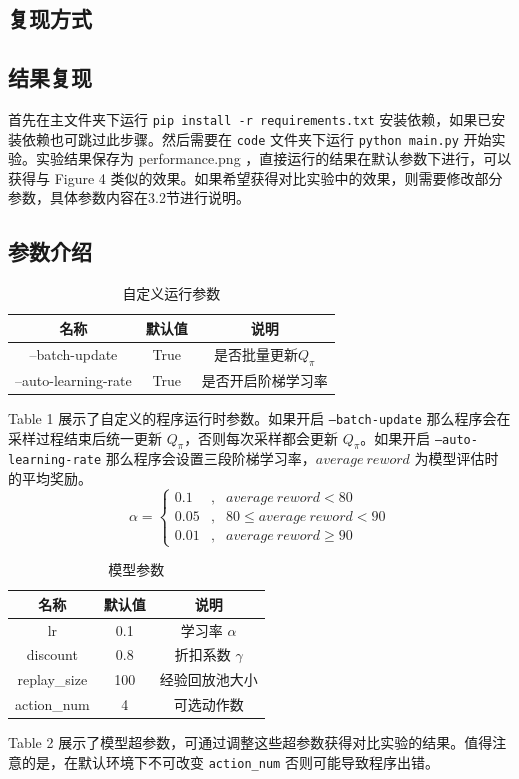 \documentclass[a4paper,12pt]{article}
\begin{document}
\begin{CJK}{UTF8}{gbsn}
\section{复现方式}
\subsection{结果复现}
首先在主文件夹下运行 \texttt{pip install -r requirements.txt} 安装依赖，如果已安装依赖也可跳过此步骤。然后需要在 \texttt{code} 文件夹下运行 \texttt{python main.py} 开始实验。实验结果保存为 performance.png ，直接运行的结果在默认参数下进行，可以获得与 Figure 4 类似的效果。如果希望获得对比实验中的效果，则需要修改部分参数，具体参数内容在3.2节进行说明。
\subsection{参数介绍}
\begin{table}[!h]
	\renewcommand{\arraystretch}{1.1}
	\caption{自定义运行参数}
	\centering
	\begin{tabular}{ccc}
		\hline
		名称& 默认值& 说明\\
		\hline
		--batch-update& True & 是否批量更新$Q_\pi$\\
		--auto-learning-rate& True & 是否开启阶梯学习率\\
		\hline
	\end{tabular}
\end{table}
Table 1 展示了自定义的程序运行时参数。如果开启 \texttt{--batch-update} 那么程序会在采样过程结束后统一更新 $Q_\pi$，否则每次采样都会更新 $Q_\pi$。如果开启 \texttt{--auto-learning-rate} 那么程序会设置三段阶梯学习率，$average\ reword$ 为模型评估时的平均奖励。
$$\alpha=\left\{\begin{aligned}
	0.1 &,& average\ reword<80 \\
	0.05 &,& 80\leq average\ reword<90 \\
	0.01 &,& average\ reword\geq 90
\end{aligned}\right.$$
\begin{table}[!h]
	\renewcommand{\arraystretch}{1.1}
	\caption{模型参数}
	\centering
	\begin{tabular}{ccc}
		\hline
		名称& 默认值& 说明\\
		\hline
		lr& 0.1 & 学习率 $\alpha$\\
		discount& 0.8 & 折扣系数 $\gamma$\\
		replay\_size& 100 & 经验回放池大小\\
		action\_num& 4 & 可选动作数 \\
		\hline
	\end{tabular}
\end{table}
\newpage
Table 2 展示了模型超参数，可通过调整这些超参数获得对比实验的结果。值得注意的是，在默认环境下不可改变 \texttt{action\_num} 否则可能导致程序出错。

\end{CJK}
\end{document}
